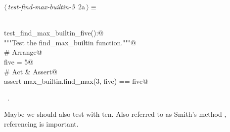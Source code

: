 \documentclass[a4paper,11pt]{article}
\begin{document}
\begin{flushleft} \small
\begin{minipage}{\linewidth}\label{scrap3}\raggedright\small
{} $\langle\,${\itshape test-find-max-builtin-5}\nobreak\ {\footnotesize {2a}}$\,\rangle\equiv$
\vspace{-1ex}
\begin{list}{}{} \item
\mbox{}\lstinline@@\\
\mbox{}\lstinline@def test_find_max_builtin_five():@\\
\mbox{}\lstinline@    """Test the find_max_builtin function."""@\\
\mbox{}\lstinline@    # Arrange@\\
\mbox{}\lstinline@    five = 5@\\
\mbox{}\lstinline@    # Act & Assert@\\
\mbox{}\lstinline@    assert max_builtin.find_max(3, five) == five@\\
\mbox{}\lstinline@@{\NWsep}
\end{list}
\vspace{-1.5ex}
\footnotesize
\begin{list}{}{\setlength{\itemsep}{-\parsep}\setlength{\itemindent}{-\leftmargin}}
\item \NWtxtMacroRefIn\ .

\item{}
\end{list}
\end{minipage}\vspace{4ex}
\end{flushleft}
Maybe we should also test with ten.
Also referred to as Smith's method \cite{smith2020example},
referencing is important.
\end{document}
